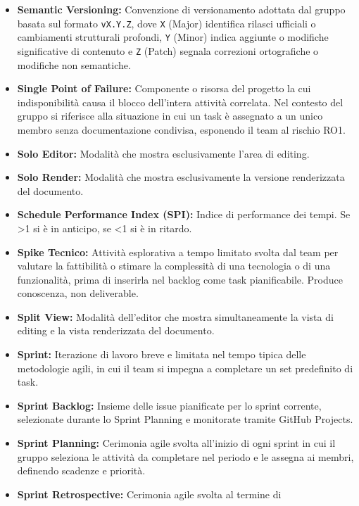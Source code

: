 \begin{itemize}[leftmargin=*]
      \item \textbf{Semantic Versioning:} Convenzione di versionamento adottata dal
          gruppo basata sul formato \texttt{vX.Y.Z}, dove \texttt{X} (Major)
          identifica rilasci ufficiali o cambiamenti strutturali profondi,
          \texttt{Y} (Minor) indica aggiunte o modifiche significative di contenuto
          e \texttt{Z} (Patch) segnala correzioni ortografiche o modifiche non
          semantiche.
      \item \textbf{Single Point of Failure:} Componente o risorsa del progetto la cui
      indisponibilità causa il blocco dell'intera attività correlata. Nel contesto
      del gruppo si riferisce alla situazione in cui un task
      è assegnato a un unico membro senza documentazione condivisa, esponendo il
      team al rischio RO1.
      \item \textbf{Solo Editor:} Modalità che mostra esclusivamente l’area di editing.
      \item \textbf{Solo Render:} Modalità che mostra esclusivamente la versione renderizzata del documento.
      \item \textbf{Schedule Performance Index (SPI):} Indice di performance dei tempi.
      Se >1 si è in anticipo, se <1 si è in ritardo.
      \item \textbf{Spike Tecnico:} Attività esplorativa a tempo limitato svolta dal team
      per valutare la fattibilità o stimare la complessità di una tecnologia o di
      una funzionalità, prima di inserirla nel backlog come task
      pianificabile. Produce conoscenza, non deliverable.
      \item \textbf{Split View:} Modalità dell’editor che mostra simultaneamente la vista di editing e la vista renderizzata del documento.
      \item \textbf{Sprint:} Iterazione di lavoro breve e limitata nel tempo tipica delle metodologie agili, in cui il team si impegna a completare un set predefinito di task.
      \item \textbf{Sprint Backlog:} Insieme delle issue pianificate per lo sprint corrente, selezionate durante lo Sprint Planning e monitorate tramite GitHub Projects.
      \item \textbf{Sprint Planning:} Cerimonia agile svolta all'inizio di ogni
            sprint in cui il gruppo seleziona le attività da completare nel periodo
            e le assegna ai membri, definendo scadenze e priorità.
      \item \textbf{Sprint Retrospective:} Cerimonia agile svolta al termine di

\end{itemize}
